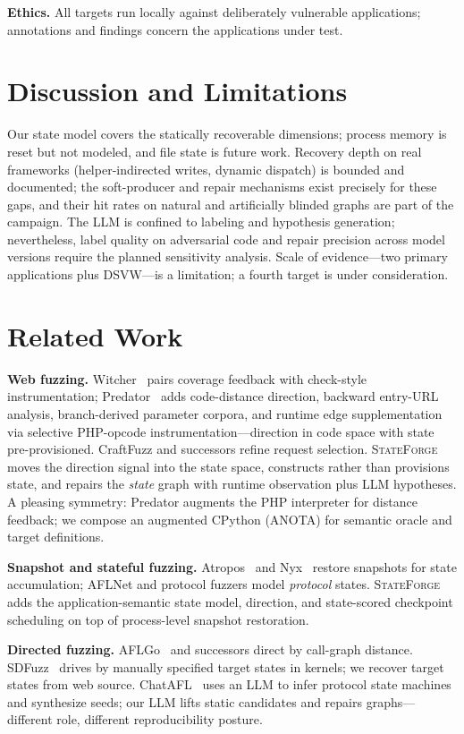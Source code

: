 \documentclass[letterpaper,twocolumn,10pt]{article}
\newcommand{\sys}{\textsc{StateForge}}
\begin{document}
\textbf{Ethics.} All targets run locally against deliberately vulnerable applications; annotations and findings concern the applications under test.

\section{Discussion and Limitations}
\label{sec:discussion}
Our state model covers the statically recoverable dimensions; process memory is reset but not modeled, and file state is future work. Recovery depth on real frameworks (helper-indirected writes, dynamic dispatch) is bounded and documented; the soft-producer and repair mechanisms exist precisely for these gaps, and their hit rates on natural and artificially blinded graphs are part of the campaign. The LLM is confined to labeling and hypothesis generation; nevertheless, label quality on adversarial code and repair precision across model versions require the planned sensitivity analysis. Scale of evidence---two primary applications plus DSVW---is a limitation; a fourth target is under consideration.

\section{Related Work}
\label{sec:related}
\textbf{Web fuzzing.} Witcher~\cite{witcher} pairs coverage feedback with check-style instrumentation; Predator~\cite{predator} adds code-distance direction, backward entry-URL analysis, branch-derived parameter corpora, and runtime edge supplementation via selective PHP-opcode instrumentation---direction in code space with state pre-provisioned. CraftFuzz and successors refine request selection. \sys{} moves the direction signal into the state space, constructs rather than provisions state, and repairs the \emph{state} graph with runtime observation plus LLM hypotheses. A pleasing symmetry: Predator augments the PHP interpreter for distance feedback; we compose an augmented CPython (ANOTA) for semantic oracle and target definitions.

\textbf{Snapshot and stateful fuzzing.} Atropos~\cite{atropos} and Nyx~\cite{nyx} restore snapshots for state accumulation; AFLNet and protocol fuzzers model \emph{protocol} states. \sys{} adds the application-semantic state model, direction, and state-scored checkpoint scheduling on top of process-level snapshot restoration.

\textbf{Directed fuzzing.} AFLGo~\cite{aflgo} and successors direct by call-graph distance. SDFuzz~\cite{sdfuzz} drives by manually specified target states in kernels; we recover target states from web source. ChatAFL~\cite{chatafl} uses an LLM to infer protocol state machines and synthesize seeds; our LLM lifts static candidates and repairs graphs---different role, different reproducibility posture.
\end{document}
